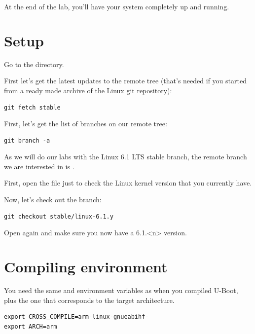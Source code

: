 
At the end of the lab, you'll have your system completely up and
running.

\section{Setup}

Go to the  directory.

First let's get the latest updates to the remote  tree
(that's needed if you started from a ready made archive of the Linux git
repository):

\begin{verbatim}
git fetch stable
\end{verbatim}

First, let's get the list of branches on our  remote tree:

\begin{verbatim}
git branch -a
\end{verbatim}

As we will do our labs with the Linux 6.1 LTS stable branch, the remote branch
we are interested in is .

First, open the  file just to check the Linux kernel
version that you currently have.

Now, let's check out the  branch:
\begin{verbatim}
git checkout stable/linux-6.1.y
\end{verbatim}

Open  again and make sure you now have a 6.1.<n> version.

\section{Compiling environment}

You need the same  and  environment
variables as when you compiled U-Boot, plus the  one that
corresponds to the target architecture.

\begin{verbatim}
export CROSS_COMPILE=arm-linux-gnueabihf-
export ARCH=arm
\end{verbatim}

